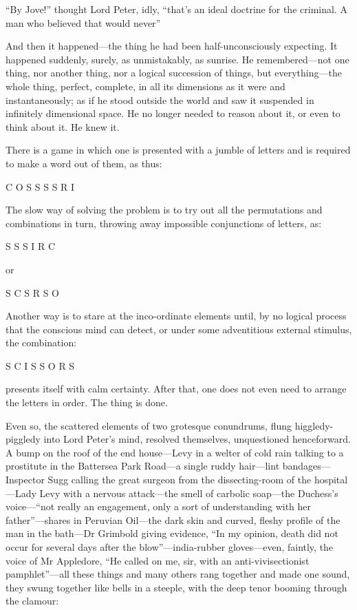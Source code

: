 \enquote{By Jove!} thought Lord Peter, idly, \enquote{that’s an ideal doctrine for the criminal. A man who believed that would never\longdash}

And then it happened\allowbreak---\allowbreak the thing he had been half-unconsciously expecting. It happened suddenly, surely, as unmistakably, as sunrise. He remembered\allowbreak---\allowbreak not one thing, nor another thing, nor a logical succession of things, but everything\allowbreak---\allowbreak the whole thing, perfect, complete, in all its dimensions as it were and instantaneously; as if he stood outside the world and saw it suspended in infinitely dimensional space. He no longer needed to reason about it, or even to think about it. He knew it.

There is a game in which one is presented with a jumble of letters and is required to make a word out of them, as thus:

\textsc{C O S S S S R I}

The slow way of solving the problem is to try out all the permutations and combinations in turn, throwing away impossible conjunctions of letters, as:

\textsc{S S S I R C}

or

\textsc{S C S R S O}

Another way is to stare at the inco-ordinate elements until, by no logical process that the conscious mind can detect, or under some adventitious external stimulus, the combination:

\textsc{S C I S S O R S}

presents itself with calm certainty. After that, one does not even need to arrange the letters in order. The thing is done.

Even so, the scattered elements of two grotesque conundrums, flung higgledy-piggledy into Lord Peter’s mind, resolved themselves, unquestioned henceforward. A bump on the roof of the end house\allowbreak---\allowbreak Levy in a welter of cold rain talking to a prostitute in the Battersea Park Road\allowbreak---\allowbreak a single ruddy hair\allowbreak---\allowbreak lint bandages\allowbreak---\allowbreak Inspector Sugg calling the great surgeon from the dissecting-room of the hospital\allowbreak---\allowbreak Lady Levy with a nervous attack\allowbreak---\allowbreak the smell of carbolic soap\allowbreak---\allowbreak the Duchess’s voice---\enquote{not really an engagement, only a sort of understanding with her father}---shares in Peruvian Oil\allowbreak---\allowbreak the dark skin and curved, fleshy profile of the man in the bath\allowbreak---\allowbreak Dr Grimbold giving evidence, \enquote{In my opinion, death did not occur for several days after the blow}---india-rubber gloves\allowbreak---\allowbreak even, faintly, the voice of Mr Appledore, \enquote{He called on me, sir, with an anti-vivisectionist pamphlet}---all these things and many others rang together and made one sound, they swung together like bells in a steeple, with the deep tenor booming through the clamour:

